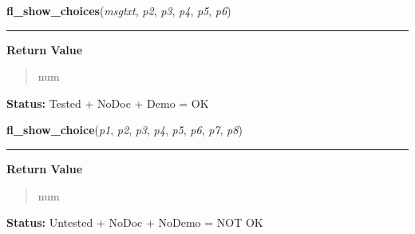 \hspace{.8\funcindent}\begin{boxedminipage}{\funcwidth}

    \raggedright \textbf{fl\_show\_choices}(\textit{msgtxt}, \textit{p2}, \textit{p3}, \textit{p4}, \textit{p5}, \textit{p6})

    \vspace{-1.5ex}

    \rule{\textwidth}{0.5\fboxrule}
\setlength{\parskip}{2ex}
\setlength{\parskip}{1ex}
      \textbf{Return Value}
    \vspace{-1ex}

      \begin{quote}
      num

      \end{quote}

\textbf{Status:} Tested + NoDoc + Demo = OK



    \end{boxedminipage}

    \label{xformslib:flgoodies:fl_show_choice}

    \vspace{0.5ex}

\hspace{.8\funcindent}\begin{boxedminipage}{\funcwidth}

    \raggedright \textbf{fl\_show\_choice}(\textit{p1}, \textit{p2}, \textit{p3}, \textit{p4}, \textit{p5}, \textit{p6}, \textit{p7}, \textit{p8})

    \vspace{-1.5ex}

    \rule{\textwidth}{0.5\fboxrule}
\setlength{\parskip}{2ex}
\setlength{\parskip}{1ex}
      \textbf{Return Value}
    \vspace{-1ex}

      \begin{quote}
      num

      \end{quote}

\textbf{Status:} Untested + NoDoc + NoDemo = NOT OK



    \end{boxedminipage}

    \label{xformslib:flgoodies:fl_hide_choice}

